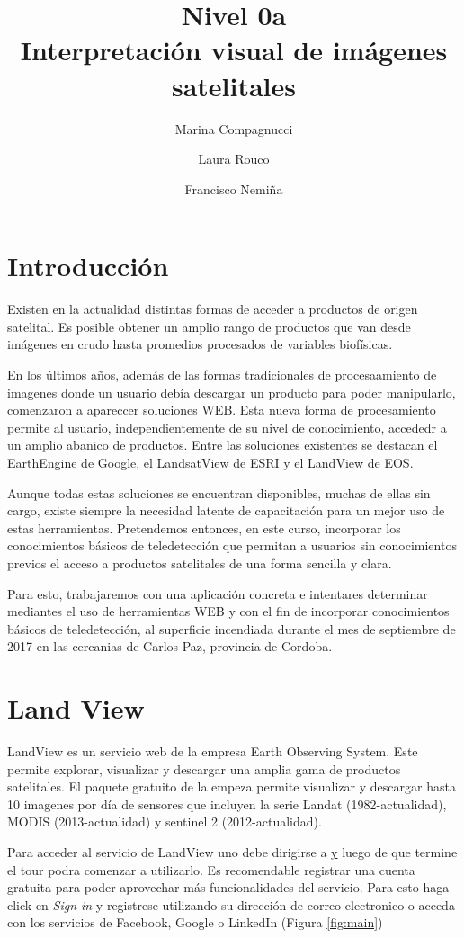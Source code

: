 \documentclass[a4paper,10pt]{article}
\title{{\large Nivel 0a} \\ Interpretación visual de imágenes satelitales}
\author{Marina Compagnucci \and Laura Rouco \and Francisco Nemiña}
\begin{document}
\maketitle
\titlepage

\section{Introducción}
Existen en la actualidad distintas formas de acceder a productos de origen satelital. Es posible obtener un amplio rango de productos que van desde imágenes en crudo hasta promedios procesados de variables biofísicas.

En los últimos años, además de las formas tradicionales de procesaamiento de imagenes donde un usuario debía descargar un producto para poder manipularlo, comenzaron a apareccer soluciones WEB. Esta nueva forma de procesamiento permite al usuario, independientemente de su nivel de conocimiento, accededr a un amplio abanico de productos. Entre las soluciones existentes se destacan el EarthEngine de Google, el LandsatView de ESRI y el LandView de EOS.

Aunque todas estas soluciones se encuentran disponibles, muchas de ellas sin cargo, existe siempre la necesidad latente de capacitación para un mejor uso de estas herramientas. Pretendemos entonces, en este curso, incorporar los conocimientos básicos de teledetección que permitan a usuarios sin conocimientos previos el acceso a productos satelitales de una forma sencilla y clara.

Para esto, trabajaremos con una aplicación concreta e intentares determinar mediantes el uso de herramientas WEB y con el fin de incorporar conocimientos básicos de teledetección, al superficie incendiada durante el mes de septiembre de 2017 en las cercanias de Carlos Paz, provincia de Cordoba.

\section{Land View}

LandView es un servicio web de la empresa Earth Observing System. Este permite explorar, visualizar y descargar una amplia gama de productos satelitales. El paquete gratuito de la empeza permite visualizar y descargar hasta 10 imagenes por día de sensores que incluyen la serie Landat (1982-actualidad), MODIS (2013-actualidad) y sentinel 2 (2012-actualidad).

Para acceder al servicio de LandView uno debe dirigirse a \href{https://lv.eosda.com} y luego de que termine el tour podra comenzar a utilizarlo. Es recomendable registrar una cuenta gratuita para poder aprovechar más funcionalidades del servicio. Para esto haga click en \emph{Sign in} y registrese utilizando su dirección de correo electronico o acceda con los servicios de Facebook, Google o LinkedIn (Figura \ref{fig:main})
\end{document}

